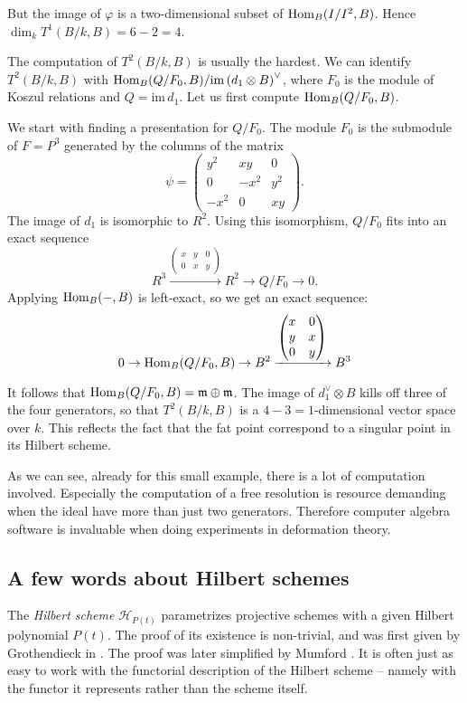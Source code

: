 \begin{example}
But the image of $\varphi$ is a two-dimensional subset of $\operatorname{Hom}_B(I/I^2,B)$. Hence $\dim_k T^1(B/k,B) = 6-2=4$.

The computation of $T^2(B/k,B)$ is usually the hardest. We can identify $T^2(B/k,B)$ with $\operatorname{Hom}_B(Q/F_0,B)/\mathrm{im } \left(d_1 \otimes B\right)^{\vee}$, where $F_0$ is the module of Koszul relations and $Q= \mathrm{im } \, d_1$. Let us first compute $\operatorname{Hom}_B(Q/F_0,B)$. 

We start with finding a presentation for $Q/F_0$. The module $F_0$ is the submodule of $F=P^3$ generated by the columns of the matrix
\[
\psi = \begin{pmatrix}
y^2 & xy & 0 \\
0 & -x^2 & y^2 \\
-x^2 & 0 & xy
\end{pmatrix}.
\]
The image of $d_1$ is isomorphic to $R^2$. Using this isomorphism, $Q/F_0$ fits into an exact sequence
\[
R^3 \xrightarrow{
	\begin{pmatrix}
	x & y & 0 \\ 0 & x & y
	\end{pmatrix}
} R^2 \to Q/F_0 \to 0.
\]
Applying $\operatorname{Hom}_B(-,B)$ is left-exact, so we get an exact sequence:
\[
0 \to \operatorname{Hom}_B(Q/F_0,B) \to B^2 \xrightarrow{
	\begin{pmatrix}
	x & 0 \\ y & x \\ 0 & y
	\end{pmatrix}
} B^3
\]

It follows that $\operatorname{Hom}_B(Q/F_0,B)= \mathfrak m \oplus \mathfrak m$.  The image of $d_1^\vee \otimes B$ kills off three of the four generators, so that $T^2(B/k,B)$ is a $4-3=1$-dimensional vector space over $k$. This reflects the fact that the fat point correspond to a singular point in its Hilbert scheme.

As we can see, already for this small example, there is a lot of computation involved. Especially the computation of a free resolution is resource demanding when the ideal have more than just two generators. Therefore computer algebra software is invaluable when doing experiments in deformation theory.
\end{example}

\subsection{A few words about Hilbert schemes}

The \emph{Hilbert scheme} $\mathscr H_{P(t)}$ parametrizes projective schemes with a given Hilbert polynomial $P(t)$. The proof of its existence is non-trivial, and was first given by Grothendieck in \cite{MR1611822}. The proof was later simplified by Mumford \cite{MR0209285}. It is often just as easy to work with the functorial description of the Hilbert scheme -- namely with the functor it represents rather than the scheme itself.

